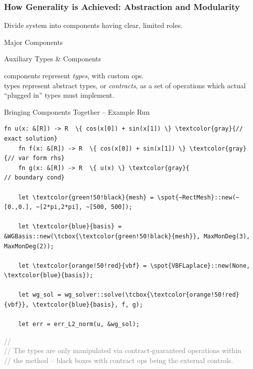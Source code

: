 \documentclass[compress]{beamer}
\begin{document}
\begin{frame}
  \frametitle{How Generality is Achieved: Abstraction and Modularity}
  Divide system into components having clear, limited roles.\\
  \pause
  \begin{block}{Major Components}
  \end{block}
  \pause
  \begin{block}{Auxiliary Types \& Components}
  \end{block}
  \pause
   components represent \emph{types}, with custom ops.\\
  \pause
   types represent abstract
  types, or \emph{contracts}, as a set of operations which actual ``plugged in'' types must implement.
\end{frame}

\begin{frame}[fragile]{Bringing Components Together -- Example Run}
  \begin{Verbatim}[gobble=4, commandchars=\\\{\}, fontsize=\small, fontfamily=tt]
    fn u(x: &[R]) -> R  \{ cos(x[0]) + sin(x[1]) \} \textcolor{gray}{// exact solution}
    fn f(x: &[R]) -> R  \{ cos(x[0]) + sin(x[1]) \} \textcolor{gray}{// var form rhs}
    fn g(x: &[R]) -> R  \{ u(x) \} \textcolor{gray}{                 // boundary cond}

    let \textcolor{green!50!black}{mesh} = \spot{~RectMesh}::new(~[0.,0.], ~[2*pi,2*pi], ~[500, 500]);

    let \textcolor{blue}{basis} = &WGBasis::new(\tcbox{\textcolor{green!50!black}{mesh}}, MaxMonDeg(3), MaxMonDeg(2));

    let \textcolor{orange!50!red}{vbf} = \spot{VBFLaplace}::new(None, \textcolor{blue}{basis});

    let wg_sol = wg_solver::solve(\tcbox{\textcolor{orange!50!red}{vbf}}, \textcolor{blue}{basis}, f, g);

    let err = err_L2_norm(u, &wg_sol);
  \end{Verbatim}
  \footnotesize {
    \textcolor{gray}{// }\\
    \textcolor{gray}{// The types are only manipulated via contract-guaranteed operations within\\
      // the method -- black boxes with contract ops being the external controls.}
  }
\end{frame}
\end{document}
